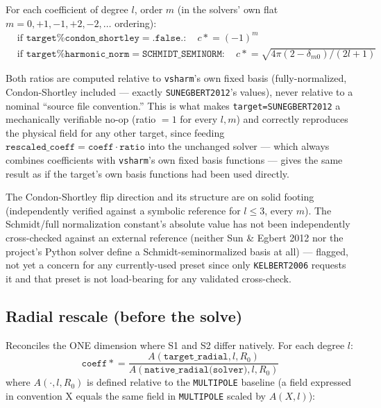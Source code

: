 \documentclass[11pt]{article}
\begin{document}
For each coefficient of degree $l$, order $m$ (in the solvers' own flat $m=0,+1,-1,+2,-2,\dots$
ordering):
\begin{align}
&\text{if } \texttt{target\%condon\_shortley} = \texttt{.false.}: \quad c \mathrel{*}= (-1)^m \\
&\text{if } \texttt{target\%harmonic\_norm} = \texttt{SCHMIDT\_SEMINORM}: \quad c \mathrel{*}= \sqrt{4\pi(2-\delta_{m0})/(2l+1)}
\end{align}

Both ratios are computed relative to \texttt{vsharm}'s own fixed basis (fully-normalized,
Condon-Shortley included --- exactly \texttt{SUNEGBERT2012}'s values), never relative to a nominal
``source file convention.'' This is what makes \texttt{target=SUNEGBERT2012} a mechanically
verifiable no-op (ratio $=1$ for every $l,m$) and correctly reproduces the physical field for any
other target, since feeding $\texttt{rescaled\_coeff} = \texttt{coeff}\cdot\texttt{ratio}$ into the
unchanged solver --- which always combines coefficients with \texttt{vsharm}'s own fixed basis
functions --- gives the same result as if the target's own basis functions had been used directly.

The Condon-Shortley flip direction and its structure are on solid footing (independently verified
against a symbolic reference for $l\le 3$, every $m$). The Schmidt/full normalization constant's
absolute value has not been independently cross-checked against an external reference (neither Sun
\& Egbert 2012 nor the project's Python solver define a Schmidt-seminormalized basis at all) ---
flagged, not yet a concern for any currently-used preset since only \texttt{KELBERT2006} requests
it and that preset is not load-bearing for any validated cross-check.

\subsection{Radial rescale (before the solve)}
\label{sec:radial}

Reconciles the ONE dimension where S1 and S2 differ natively. For each degree $l$:
\begin{equation}
\texttt{coeff} \mathrel{*}= \frac{A(\texttt{target\_radial},l,R_0)}{A(\texttt{native\_radial(solver)},l,R_0)}
\end{equation}
where $A(\cdot,l,R_0)$ is defined relative to the \texttt{MULTIPOLE} baseline (a field expressed in
convention X equals the same field in \texttt{MULTIPOLE} scaled by $A(X,l)$):
\end{document}
